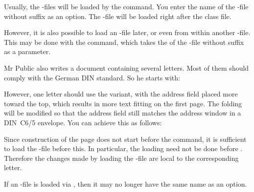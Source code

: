 \begin{Declaration}
\end{Declaration}
%
Usually, the -files will be loaded by the 
command. You enter the name of the -file without suffix as an
option. The -file will be loaded right after the class
file.

However, it is also possible to load an -file later, or even from
within another -file. This may be done with the
 command, which takes the  of the
-file without suffix as a parameter.
\begin{Example}
  Mr Public also writes a document containing several letters. Most of them
  should comply with the German DIN standard. So he starts with:
  However, one letter should use the  variant, with the
  address field placed more toward the top, which results in more text
  fitting on the first page. The folding will be modified so that the
  address field still matches the address window in a DIN~C6/5 envelope.
  You can achieve this as follows:
  Since construction of the page does not start before the
   command, it is sufficient to load the
  -file before this. In particular, the loading need not be done
  before . Therefore the changes made by
  loading the -file are local to the corresponding letter.
\end{Example}

If an -file is loaded via
, then it may no longer have the same name as an option.

